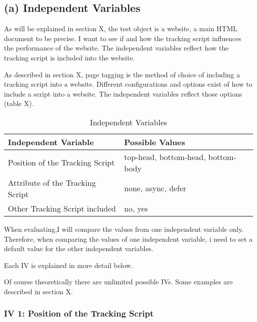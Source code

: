 
\subsection{(a) Independent Variables}


As will be explained in section X, the test object is a website, a main HTML document to be precise.
I want to see if and how the tracking script influences the performance of the website.
The independent variables reflect how the tracking script is included into the website.


As described in section X, page tagging is the method of choice of including a tracking script into a website.
Different configurations and options exist of how to include a script into a website.
The independent variables reflect those options (table X).

\begin{table}[h]
	\small
	\centering
	\begin{tabular}{ | l | l | }
	\hline
	Independent Variable \cellcolor{lightgrey} & Possible Values \cellcolor{lightgrey} \\
	\hline
	Position of the Tracking Script & top-head, bottom-head, bottom-body \\
	Attribute of the Tracking Script & none, async, defer \\
	Other Tracking Script included & no, yes \\
	\hline
	\end{tabular}
	\medskip
	\caption{Independent Variables}
	\label{table:independent_variables}
\end{table}


When evaluating,I will compare the values from one independent variable only.
Therefore, when comparing the values of one independent variable, i need to set a default value for the other independent variables.

Each IV is explained in more detail below.

Of course theoretically there are unlimited possible IVs.
Some examples are described in section X.


\subsubsection{IV 1: Position of the Tracking Script}

